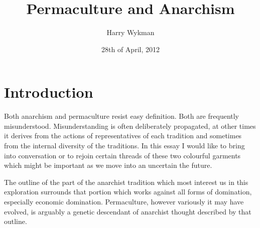 \documentclass[a4paper, 11pt]{article}
\begin{document}
\title{Permaculture and Anarchism}
\author{Harry Wykman}
\date{28th of April, 2012}
\maketitle

\section{Introduction}
Both anarchism and permaculture resist easy definition. Both are frequently misunderstood.  Misunderstanding is often deliberately propagated, at other times it derives from the actions of representatives of each tradition and sometimes from the internal diversity of the traditions.  In this essay I would like to bring into conversation or to rejoin certain threads of these two colourful garments which might be important as we move into an uncertain the future.

 The outline of the part of the anarchist tradition which most interest us in this exploration surrounds that portion which works against all forms of domination, especially economic domination.  Permaculture, however variously it may have evolved, is arguably a genetic descendant of anarchist thought described by that outline.
\end{document}
